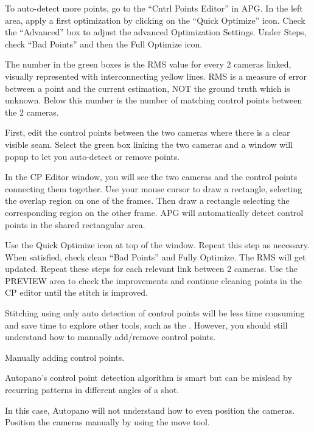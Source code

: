 \begin{fullwidth}

To auto-detect more points, go to the “Cntrl Points Editor” in APG. In the left area, apply a first optimization by clicking on the “Quick Optimize” icon. Check the “Advanced” box to adjust the advanced Optimization Settings. Under Steps, check “Bad Points” and then the Full Optimize icon.


The number in the green boxes is the RMS value for every 2 cameras linked, visually represented with interconnecting yellow lines. RMS is a measure of error between a point and the current estimation, NOT the ground truth which is unknown. Below this number is the number of matching control points between the 2 cameras.


First, edit the control points between the two cameras where there is a clear visible seam. Select the green box linking the two cameras and a window will popup to let you auto-detect or remove points.

In the CP Editor window, you will see the two cameras and the control points connecting them together. Use your mouse cursor to draw a rectangle, selecting the overlap region on one of the frames. Then draw a rectangle selecting the corresponding region on the other frame. APG will automatically detect control points in the shared rectangular area. 

\clearpage
Use the Quick Optimize icon at top of the window. Repeat this step as necessary. When satisfied, check clean “Bad Points” and Fully Optimize. The RMS will get updated. Repeat these steps for each relevant link between 2 cameras. Use the PREVIEW area to check the improvements and continue cleaning points in the CP editor until the stitch is improved.

Stitching using only auto detection of control points will be less time consuming and save time to explore other tools, such as the \textbf{}. However, you should still understand how to manually add/remove control points. 

{\large Manually adding control points. \par}

Autopano’s control point detection algorithm is smart but can be mislead by recurring patterns in different angles of a shot. 

In this case, Autopano will not understand how to even position the cameras. Position the cameras manually by using the move tool. 


\end{fullwidth}
